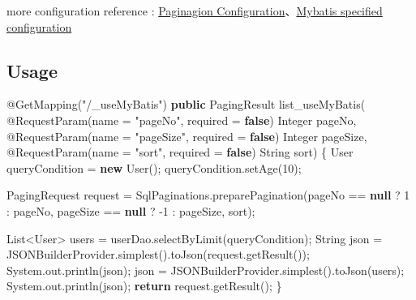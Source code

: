 \documentclass[
]{book}
\newenvironment{Shaded}{\begin{snugshade}}{\end{snugshade}}
\newcommand{\AttributeTok}[1]{\textcolor[rgb]{0.77,0.63,0.00}{#1}}
\newcommand{\BuiltInTok}[1]{#1}
\newcommand{\DecValTok}[1]{\textcolor[rgb]{0.00,0.00,0.81}{#1}}
\newcommand{\FunctionTok}[1]{\textcolor[rgb]{0.00,0.00,0.00}{#1}}
\newcommand{\KeywordTok}[1]{\textcolor[rgb]{0.13,0.29,0.53}{\textbf{#1}}}
\newcommand{\NormalTok}[1]{#1}
\newcommand{\StringTok}[1]{\textcolor[rgb]{0.31,0.60,0.02}{#1}}
\begin{document}
more configuration reference : \protect\hyperlink{pagination_configuration}{Paginagion Configuration}、\protect\hyperlink{sqlhelper_mybatis_configuration}{Mybatis specified configuration}

\hypertarget{pagination_mybatisplus_usage}{%
\subsection{Usage}\label{pagination_mybatisplus_usage}}

\begin{Shaded}
\begin{Highlighting}[]
    \AttributeTok{@GetMapping}\NormalTok{(}\StringTok{"/_useMyBatis"}\NormalTok{)}
    \KeywordTok{public}\NormalTok{ PagingResult }\FunctionTok{list_useMyBatis}\NormalTok{(}
            \AttributeTok{@RequestParam}\NormalTok{(name = }\StringTok{"pageNo"}\NormalTok{, required = }\KeywordTok{false}\NormalTok{) }\BuiltInTok{Integer}\NormalTok{ pageNo,}
            \AttributeTok{@RequestParam}\NormalTok{(name = }\StringTok{"pageSize"}\NormalTok{, required = }\KeywordTok{false}\NormalTok{) }\BuiltInTok{Integer}\NormalTok{ pageSize,}
            \AttributeTok{@RequestParam}\NormalTok{(name = }\StringTok{"sort"}\NormalTok{, required = }\KeywordTok{false}\NormalTok{) }\BuiltInTok{String}\NormalTok{ sort) \{}
\NormalTok{        User queryCondition = }\KeywordTok{new} \FunctionTok{User}\NormalTok{();}
\NormalTok{        queryCondition.}\FunctionTok{setAge}\NormalTok{(}\DecValTok{10}\NormalTok{);}

\NormalTok{        PagingRequest request = SqlPaginations.}\FunctionTok{preparePagination}\NormalTok{(pageNo == }\KeywordTok{null}\NormalTok{ ? }\DecValTok{1}\NormalTok{ : pageNo, pageSize == }\KeywordTok{null}\NormalTok{ ? -}\DecValTok{1}\NormalTok{ : pageSize, sort);}

        \BuiltInTok{List}\NormalTok{<User> users = userDao.}\FunctionTok{selectByLimit}\NormalTok{(queryCondition);}
        \BuiltInTok{String}\NormalTok{ json = JSONBuilderProvider.}\FunctionTok{simplest}\NormalTok{().}\FunctionTok{toJson}\NormalTok{(request.}\FunctionTok{getResult}\NormalTok{());}
        \BuiltInTok{System}\NormalTok{.}\FunctionTok{out}\NormalTok{.}\FunctionTok{println}\NormalTok{(json);}
\NormalTok{        json = JSONBuilderProvider.}\FunctionTok{simplest}\NormalTok{().}\FunctionTok{toJson}\NormalTok{(users);}
        \BuiltInTok{System}\NormalTok{.}\FunctionTok{out}\NormalTok{.}\FunctionTok{println}\NormalTok{(json);}
        \KeywordTok{return}\NormalTok{ request.}\FunctionTok{getResult}\NormalTok{();}
\NormalTok{    \}}
\end{Highlighting}
\end{Shaded}
\end{document}
